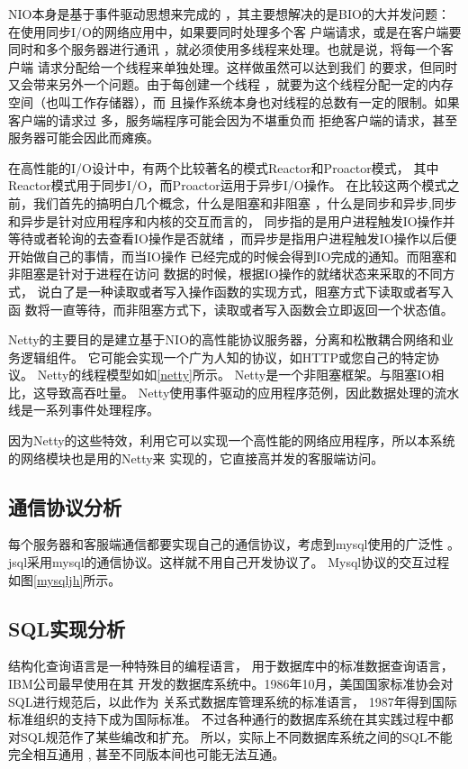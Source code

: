NIO本身是基于事件驱动思想来完成的
，其主要想解决的是BIO的大并发问题：
 在使用同步I/O的网络应用中，如果要同时处理多个客
 户端请求，或是在客户端要同时和多个服务器进行通讯
 ，就必须使用多线程来处理。也就是说，将每一个客户端
 请求分配给一个线程来单独处理。这样做虽然可以达到我们
 的要求，但同时又会带来另外一个问题。由于每创建一个线程
 ，就要为这个线程分配一定的内存空间（也叫工作存储器），而
 且操作系统本身也对线程的总数有一定的限制。如果客户端的请求过
 多，服务端程序可能会因为不堪重负而
 拒绝客户端的请求，甚至服务器可能会因此而瘫痪。

在高性能的I/O设计中，有两个比较著名的模式Reactor和Proactor模式，
其中Reactor模式用于同步I/O，而Proactor运用于异步I/O操作。
在比较这两个模式之前，我们首先的搞明白几个概念，什么是阻塞和非阻塞
，什么是同步和异步,同步和异步是针对应用程序和内核的交互而言的，
同步指的是用户进程触发IO操作并等待或者轮询的去查看IO操作是否就绪
，而异步是指用户进程触发IO操作以后便开始做自己的事情，而当IO操作
已经完成的时候会得到IO完成的通知。而阻塞和非阻塞是针对于进程在访问
数据的时候，根据IO操作的就绪状态来采取的不同方式，
说白了是一种读取或者写入操作函数的实现方式，阻塞方式下读取或者写入函
数将一直等待，而非阻塞方式下，读取或者写入函数会立即返回一个状态值。

Netty的主要目的是建立基于NIO的高性能协议服务器，分离和松散耦合网络和业务逻辑组件。
它可能会实现一个广为人知的协议，如HTTP或您自己的特定协议。
Netty的线程模型如如\ref{netty}所示。
Netty是一个非阻塞框架。与阻塞IO相比，这导致高吞吐量。
Netty使用事件驱动的应用程序范例，因此数据处理的流水线是一系列事件处理程序。

因为Netty的这些特效，利用它可以实现一个高性能的网络应用程序，所以本系统的网络模块也是用的Netty来
实现的，它直接高并发的客服端访问。
\subsection{通信协议分析}
每个服务器和客服端通信都要实现自己的通信协议，考虑到mysql使用的广泛性
。jsql采用mysql的通信协议。这样就不用自己开发协议了。
Mysql协议的交互过程如图\ref{mysqljh}所示。
\subsection{SQL实现分析}
结构化查询语言是一种特殊目的编程语言，
用于数据库中的标准数据查询语言，IBM公司最早使用在其
开发的数据库系统中。1986年10月，美国国家标准协会对SQL进行规范后，以此作为
关系式数据库管理系统的标准语言，
1987年得到国际标准组织的支持下成为国际标准。
不过各种通行的数据库系统在其实践过程中都对SQL规范作了某些编改和扩充。
所以，实际上不同数据库系统之间的SQL不能完全相互通用 ,
 甚至不同版本间也可能无法互通。

